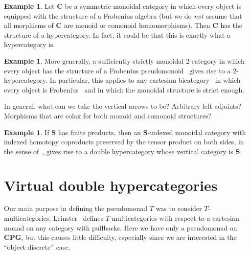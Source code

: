 \documentclass{article}
\theoremstyle{definition}
\newtheorem{eg}[thm]{Example}
\theoremstyle{remark}
\def\cpg{\ensuremath{\mathbf{CPG}}\xspace}
\def\bC{\ensuremath{\mathbf{C}}\xspace}
\def\bS{\ensuremath{\mathbf{S}}\xspace}
\begin{document}
\begin{eg}
  Let \bC be a symmetric monoidal category in which every object is equipped with the structure of a Frobenius algebra (but we do \emph{not} assume that all morphisms of \bC are monoid or comonoid homomorphisms).
  Then \bC has the structure of a hypercategory.
  In fact, it could be that this is exactly what a hypercategory is.
\end{eg}

\begin{eg}
  More generally, a sufficiently strictly monoidal 2-category in which every object has the structure of a Frobenius pseudomonoid~\cite{street:frob-psmon} gives rise to a 2-hypercategory.
  In particular, this applies to any cartesian bicategory~\cite{ckww:cartbicats-ii} in which every object is Frobenius~\cite{ww:frob-cart} and in which the monoidal structure is strict enough.

  In general, what can we take the vertical arrows to be?
  Arbitrary left adjoints?
  Morphisms that are colax for both monoid and comonoid structures?
\end{eg}

\begin{eg}
  If \bS has finite products, then an \bS-indexed monoidal category with indexed homotopy coproducts preserved by the tensor product on both sides, in the sense of~\cite{ps:indexed}, gives rise to a double hypercategory whose vertical category is \bS.
\end{eg}




\section{Virtual double hypercategories}
\label{sec:vdhc}

Our main purpose in defining the pseudomonad $T$ was to consider $T$-multicategories.
Leinster~\cite{leinster:higher-opds} defines $T$-multicategories with respect to a cartesian monad on any category with pullbacks.
Here we have only a pseudomonad on \cpg, but this causes little difficulty, especially since we are interested in the ``object-discrete'' case.
\end{document}

